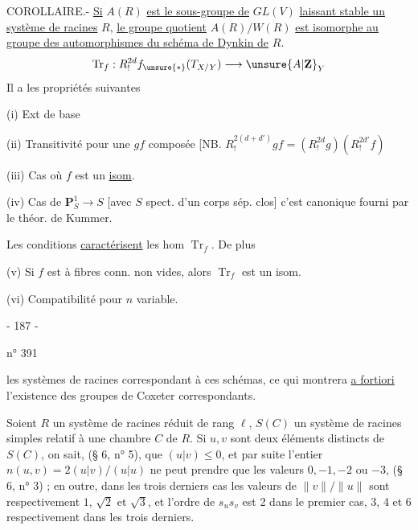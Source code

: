 COROLLAIRE.- \uline{Si} $A(R)$ \uline{est le sous-groupe de} $GL(V)$ \uline{laissant stable un système de racines} $R$, \uline{le groupe quotient} $A(R)/W(R)$ \uline{est isomorphe au groupe des automorphismes du schéma de Dynkin de} $R$.
\[
\operatorname{Tr}_f:R^{2d}_!f_{\unsure{*}}(T_{X/Y})\longrightarrow\unsure{A|\mathbf Z}_Y
\]
Il a les propriétés suivantes

(i) Ext de base

(ii) Transitivité pour une   $gf$ composée [NB. $R^{2(d+d')}_!gf=(R^{2d}_!g)(R^{2d'}_!f)$

(iii) Cas où $f$ est un \uline{isom}.

(iv)  Cas de $\mathbf P^1_S\longrightarrow S$
[avec $S$ spect. d'un corps sép. clos] c'est   canonique fourni par le théor. de Kummer.

Les conditions \uline{caractérisent} les hom $\operatorname{Tr}_f$. De plus

(v) Si $f$ est à fibres conn. non vides, alors $\operatorname{Tr}_f$ est un isom.

(vi) Compatibilité pour $n$ variable.

\begin{center}- 187 -\end{center}
\hfill n° 391

les systèmes de racines correspondant à ces schémas, ce qui montrera \uline{a fortiori} l'existence des groupes de Coxeter correspondants.

Soient $R$ un système de racines réduit de rang $\ell$, $S(C)$ un système de racines simples relatif à une chambre $C$ de $R$. Si $u,v$ sont deux éléments distincts de $S(C)$, on sait, (§ 6, n° 5), que $(u|v)\leq0$, et par suite l'entier $n(u,v)=2(u|v)/(u|u)$ ne peut prendre que les valeurs $0,-1,-2$ ou $-3$, (§ 6, n° 3) ; en outre, dans les trois derniers cas les valeurs de $\|v\|/\|u\|$ sont respectivement $1$, $\sqrt2$ et $\sqrt3$, et l'ordre de $s_us_v$ est 2 dans le premier cas, 3, 4 et 6 respectivement dans les trois derniers.

